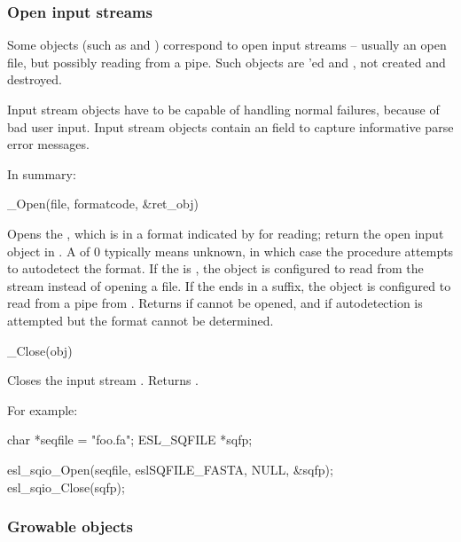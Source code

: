 \subsubsection{Open input streams}

Some objects (such as  and )
correspond to open input streams -- usually an open file, but possibly
reading from a pipe. Such objects are 'ed and
, not created and destroyed.

Input stream objects have to be capable of handling normal failures,
because of bad user input. Input stream objects contain an
 field to capture informative parse error
messages. 

In summary:

\begin{sreapi}
\hypertarget{ifc:Open} 
{\item[\_Open(file, formatcode, \&ret\_obj)]}

Opens the , which is in a format indicated by
 for reading; return the open input object in
. A  of 0 typically means unknown,
in which case the  procedure attempts to autodetect
the format. If the  is , the object is
configured to read from the  stream instead of opening a
file. If the  ends in a  suffix, the object is
configured to read from a pipe from . Returns
 if  cannot be opened, and
 if autodetection is attempted but the format cannot
be determined.

\hypertarget{ifc:Close} 
{\item[\_Close(obj)]}

Closes the input stream . Returns .
\end{sreapi}


For example:

\begin{cchunk}
    char        *seqfile = "foo.fa";
    ESL_SQFILE  *sqfp;

    esl_sqio_Open(seqfile, eslSQFILE_FASTA, NULL, &sqfp);
    esl_sqio_Close(sqfp);
\end{cchunk}



\subsubsection{Growable objects}

